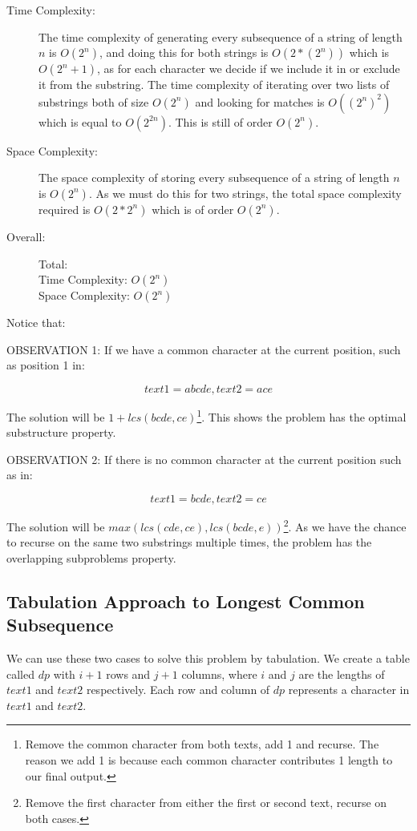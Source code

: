 \begin{description}
    \item[Time Complexity:]
        The time complexity of generating every subsequence of a string of length $n$ is $O(2^n)$,
        and doing this for both strings is $O(2 * (2^n))$ which is $O(2^n+1)$,
        as for each character we decide if we include it in or exclude it from the substring.
        The time complexity of iterating over two lists of substrings both of size $O(2^n)$ and looking for matches is $O((2^n)^2)$ which is equal to $O(2^{2n})$.
        This is still of order $O(2^n)$.

        
    \item[Space Complexity:]
        The space complexity of storing every subsequence of a string of length $n$ is $O(2^n)$.
        As we must do this for two strings, the total space complexity required is $O(2 * 2^n)$ which is of order $O(2^n)$.

    \item[Overall:] Total:\\
        Time Complexity: $O(2^n)$\\
        Space Complexity: $O(2^n)$
    
\end{description}

Notice that:

OBSERVATION 1: If we have a common character at the current position, such as position 1 in:

$$text1=abcde, text2=ace$$

The solution will be $1 + lcs(bcde,ce)$\footnote{Remove the common character from both texts, add 1 and recurse. The reason we add 1 is because each common character contributes 1 length to our final output.}.
This shows the problem has the optimal substructure property.

OBSERVATION 2: If there is no common character at the current position such as in:

$$text1=bcde, text2=ce$$

The solution will be $max(lcs(cde,ce), lcs(bcde,e))$\footnote{Remove the first character from either the first or second text, recurse on both cases.}.
As we have the chance to recurse on the same two substrings multiple times, the problem has the overlapping subproblems property.
\subsection{Tabulation Approach to Longest Common Subsequence}
We can use these two cases to solve this problem by tabulation.
We create a table called $dp$ with $i+1$ rows and $j+1$ columns, where $i$ and $j$ are the lengths of $text1$ and $text2$ respectively.
Each row and column of $dp$ represents a character in $text1$ and $text2$.

